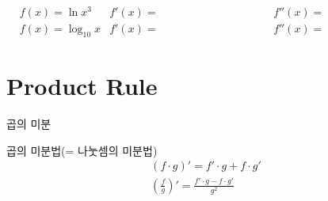 \documentclass[aspectratio=169]{beamer}
\begin{document}
\begin{frame}
  \begin{align*}
    & f(x) = \ln x^3     & f'(x)= \hspace{4cm} & f''(x)= \hspace{4cm} \\[2em]
    & f(x) = \log_{10} x & f'(x)= \hspace{4cm} & f''(x)= \hspace{4cm}
  \end{align*}
\end{frame}




\section{Product Rule}

\begin{frame}{곱의 미분}
  \begin{block}{곱의 미분법(= 나눗셈의 미분법)}
    \begin{align*}
      (f \cdot g)' = f' \cdot g + f \cdot g' \\
      \left(\frac{f}{g} \right)' = \frac{f' \cdot g - f \cdot g'}{g^2}
    \end{align*}
  \end{block}
\end{frame}
\end{document}
